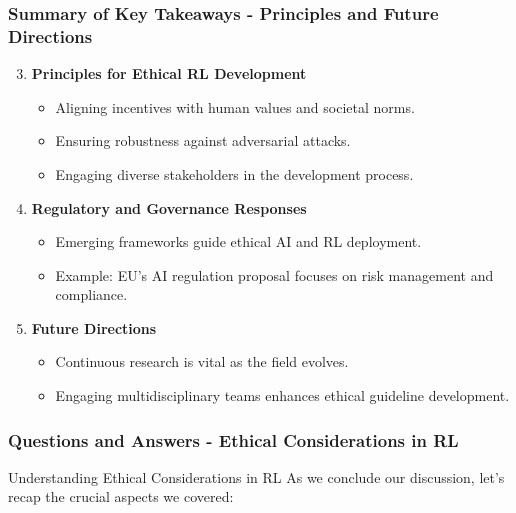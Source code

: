 \documentclass[aspectratio=169]{beamer}
\begin{document}
\begin{frame}[fragile]
    \frametitle{Summary of Key Takeaways - Principles and Future Directions}
    \begin{enumerate}
        \setcounter{enumi}{2}
        \item \textbf{Principles for Ethical RL Development}
            \begin{itemize}
                \item Aligning incentives with human values and societal norms.
                \item Ensuring robustness against adversarial attacks.
                \item Engaging diverse stakeholders in the development process.
            \end{itemize}
        \item \textbf{Regulatory and Governance Responses}
            \begin{itemize}
                \item Emerging frameworks guide ethical AI and RL deployment.
                \item Example: EU's AI regulation proposal focuses on risk management and compliance.
            \end{itemize}
        \item \textbf{Future Directions}
            \begin{itemize}
                \item Continuous research is vital as the field evolves.
                \item Engaging multidisciplinary teams enhances ethical guideline development.
            \end{itemize}
    \end{enumerate}
\end{frame}

\begin{frame}[fragile]
    \frametitle{Questions and Answers - Ethical Considerations in RL}
    \begin{block}{Understanding Ethical Considerations in RL}
        As we conclude our discussion, let's recap the crucial aspects we covered:
    \end{block}
\end{frame}
\end{document}
